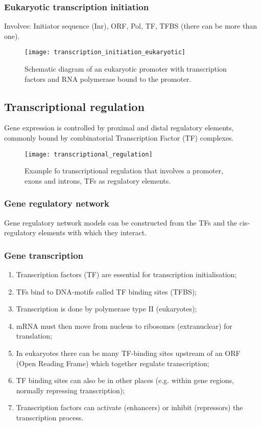 \subsubsection{Eukaryotic transcription initiation}

Involves: Initiator sequence (Inr), ORF, Pol, TF, TFBS (there can be more than one).

\begin{figure}[!htpb]
\centering
\texttt{[image: transcription\_initiation\_eukaryotic]}
\caption{Schematic diagram of an eukaryotic promoter with transcription factors and RNA polymerase bound to the promoter.}
\label{Transcritpion initiation in eukaryotes}
\end{figure}

\subsection{Transcriptional regulation}

Gene expression is controlled by proximal and distal regulatory elements,
commonly bound by combinatorial Transcription Factor (TF) complexes.

\begin{figure}[!htpb]
\centering
\texttt{[image: transcriptional\_regulation]}
\caption{Example fo transcriptional regulation that involves a promoter, exons
and introns, TFs as regulatory elements.}
\label{Transcritpion initiation in eukaryotes}
\end{figure}

\subsubsection{Gene regulatory network}

Gene regulatory network models can be constructed from the TFs and the
cis-regulatory elements with which they interact.

\subsubsection{Gene transcription}

\begin{enumerate}
\item Transcription factors (TF) are essential for transcription initialisation;
\item TFs bind to DNA-motifs called TF binding sites (TFBS);
\item Transcription is done by polymerase type II (eukaryotes);
\item mRNA must then move from nucleus to ribosomes (extranuclear) for translation;
\item In eukaryotes there can be many TF-binding sites upstream of an ORF
(Open Reading Frame) which together regulate transcription;
\item TF binding sites can also be in other places (e.g. within gene regions,
normally repressing transcription);
\item Transcription factors can activate (enhancers) or inhibit
(repressors) the transcription process.
\end{enumerate}

